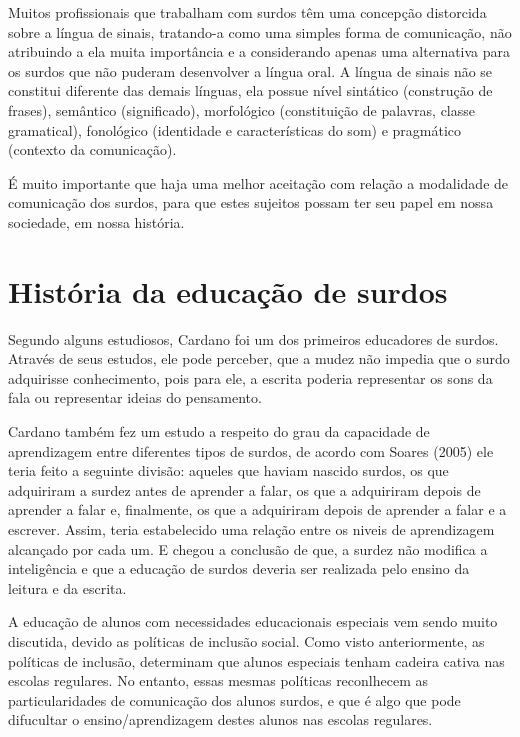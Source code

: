 \documentclass[brasil]{abnt}
\begin{document}
			Muitos profissionais que trabalham com surdos têm uma concepção distorcida sobre a língua de sinais, tratando-a como uma simples forma de comunicação, não atribuindo a ela muita importância e a considerando apenas 
			uma alternativa para os surdos que não puderam desenvolver a língua oral. A língua de sinais não se constitui diferente das demais línguas, ela possue nível sintático (construção de frases), semântico (significado), 
			morfológico (constituição de palavras, classe gramatical), fonológico (identidade e características do som) e pragmático (contexto da comunicação).
			
			É muito importante que haja uma melhor aceitação com relação a modalidade de comunicação dos surdos, para que estes sujeitos possam ter seu papel em nossa sociedade, em nossa história.
			
\chapter{História da educação de surdos}
		
	Segundo alguns estudiosos, Cardano foi um dos primeiros educadores de surdos. Através de seus estudos, ele pode perceber, que a mudez não impedia que o surdo adquirisse conhecimento, pois para ele, a 
	escrita poderia representar os sons da fala ou representar ideias do pensamento. 
	
	Cardano também fez um estudo a respeito do grau da capacidade de aprendizagem entre diferentes tipos de surdos, de acordo com Soares (2005) ele teria feito a seguinte divisão: aqueles que haviam 
	nascido surdos, os que adquiriram a surdez antes de aprender a falar, os que a adquiriram depois de aprender a falar e, finalmente, os que a adquiriram depois de aprender a falar e a escrever. 
	Assim, teria estabelecido uma relação entre os niveis de aprendizagem alcançado por cada um. E chegou a conclusão de que, a surdez não modifica a inteligência e que a educação de surdos deveria ser 
	realizada pelo ensino da leitura e da escrita.
	
	A educação de alunos com necessidades educacionais especiais vem sendo muito discutida, devido as políticas de inclusão social. Como visto anteriormente, as políticas de inclusão, 
	determinam que alunos especiais tenham cadeira cativa nas escolas regulares. No entanto, essas mesmas políticas reconlhecem as particularidades de comunicação dos alunos surdos, e que é algo 
	que pode difucultar o ensino/aprendizagem destes alunos nas escolas regulares.
	
\end{document}
